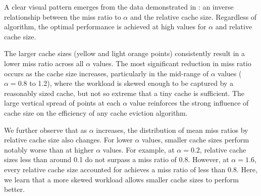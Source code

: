 A clear visual pattern emerges from the data demonstrated in : an inverse relationship between the miss ratio to $\alpha$ and the relative cache size. Regardless of algorithm, the optimal performance is achieved at high values for $\alpha$ and relative cache size.

The larger cache sizes (yellow and light orange points) consistently result in a lower miss ratio across all $\alpha$ values. The most significant reduction in miss ratio occurs as the cache size increases, particularly in the mid-range of $\alpha$ values ($\alpha=0.8$ to 1.2), where the workload is skewed enough to be captured by a reasonably sized cache, but not so extreme that a tiny cache is sufficient. The large vertical spread of points at each $\alpha$ value reinforces the strong influence of cache size on the efficiency of any cache eviction algorithm.

We further observe that as $\alpha$ increases, the distribution of mean miss ratios by relative cache size also changes. For lower $\alpha$ values, smaller cache sizes perform notably worse than at higher $\alpha$ values. For example, at $\alpha = 0.2$, relative cache sizes less than around 0.1 do not surpass a miss ratio of 0.8. However,  at $\alpha = 1.6$, every relative cache size accounted for achieves a miss ratio of less than 0.8. Here, we learn that a more skewed workload allows smaller cache sizes to perform better.

